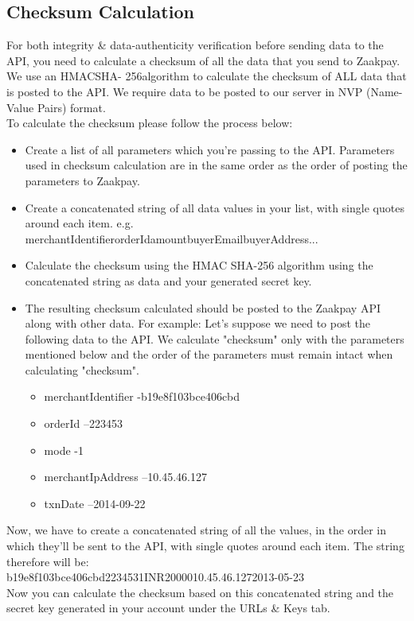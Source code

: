 \documentclass{article}
\begin{document}
\subsection{Checksum Calculation}
For both integrity \& data-authenticity verification before sending data to the API, you need to calculate a checksum of all the data that you send to Zaakpay. We use an HMACSHA- 256algorithm to calculate the checksum of ALL data that is posted to the API. We require data to be posted to our server in NVP (Name-Value Pairs) format.
\\ To calculate the checksum please follow the process below:
\begin{itemize}
\item Create a list of all parameters which you're passing to the API. Parameters used in checksum calculation are in the same order as the order of posting the parameters to Zaakpay.
\item Create a concatenated string of all data values in your list, with single quotes around each item. e.g. \textquotesingle{}merchantIdentifier\textquotesingle{}\textquotesingle{}orderId\textquotesingle{}\textquotesingle{}amount\textquotesingle{}\textquotesingle{}buyerEmail\textquotesingle{}\textquotesingle{}buyerAddress\textquotesingle{}...
\item Calculate the checksum using the HMAC SHA-256 algorithm using the concatenated string as data and your generated secret key.
\item The resulting checksum calculated should be posted to the Zaakpay API along with other data. For example: Let's suppose we need to post the following data to the API. We calculate "checksum" only with the parameters mentioned below and the order of the parameters must remain intact when calculating "checksum".
\begin{itemize}
\item merchantIdentifier -b19e8f103bce406cbd
\item orderId –223453
\item mode -1
\item merchantIpAddress –10.45.46.127
\item txnDate –2014-09-22
\end{itemize}
\end{itemize}
Now, we have to create a concatenated string of all the values, in the order in which they'll be sent to the API, with single quotes around each item. The string therefore will be:
\\\textquotesingle{}b19e8f103bce406cbd\textquotesingle{}\textquotesingle{}223453\textquotesingle{}\textquotesingle{}1\textquotesingle{}\textquotesingle{}INR\textquotesingle{}\textquotesingle{}20000\textquotesingle{}\textquotesingle{}10.45.46.127\textquotesingle{}\textquotesingle{}2013-05-23\textquotesingle{} \\ Now you can calculate the checksum based on this concatenated string and the secret key generated in
your account under the URLs \& Keys tab.
\end{document}
